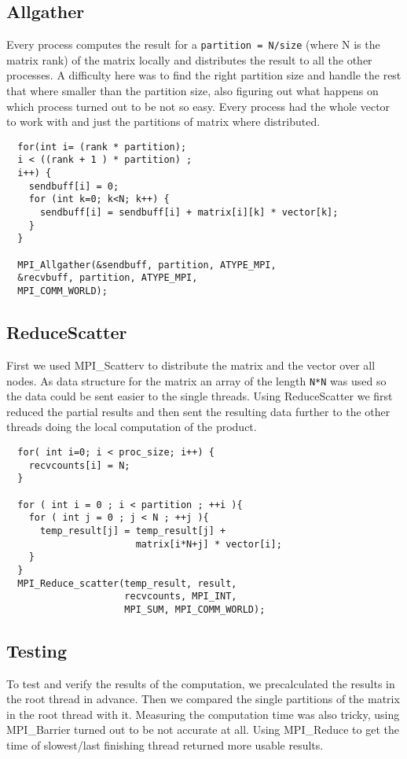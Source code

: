 \subsection{Allgather}


Every process computes the result for a \texttt{partition = N/size} (where  N is the matrix rank) of the matrix locally and distributes the result to all the other processes.
A difficulty here was to find the right partition size and handle the rest that where smaller than the partition size, also figuring out what happens on which process turned out to be not so easy.
Every process had the whole vector to work with and just the partitions of matrix where distributed.


\begin{lstlisting}
  for(int i= (rank * partition);
  i < ((rank + 1 ) * partition) ;
  i++) {
    sendbuff[i] = 0;
    for (int k=0; k<N; k++) {
      sendbuff[i] = sendbuff[i] + matrix[i][k] * vector[k];
    }
  }

  MPI_Allgather(&sendbuff, partition, ATYPE_MPI,
  &recvbuff, partition, ATYPE_MPI,
  MPI_COMM_WORLD);
\end{lstlisting}



\subsection{ReduceScatter}

First we used MPI\_Scatterv to distribute the matrix and the vector over all nodes.
As data structure for the matrix an array of the length \texttt{N*N} was used so the data could be sent easier to the single threads. Using ReduceScatter we first reduced the partial results and then sent the resulting data further to the other threads doing the local computation of the product.

\begin{lstlisting}
  for( int i=0; i < proc_size; i++) {
    recvcounts[i] = N;
  }

  for ( int i = 0 ; i < partition ; ++i ){
    for ( int j = 0 ; j < N ; ++j ){
      temp_result[j] = temp_result[j] +
                       matrix[i*N+j] * vector[i];
    }
  }
  MPI_Reduce_scatter(temp_result, result,
                     recvcounts, MPI_INT,
                     MPI_SUM, MPI_COMM_WORLD);
\end{lstlisting}

\subsection{Testing}
To test and verify the results of the computation, we precalculated the results in the root thread in advance.
Then we compared the single partitions of the matrix in the root thread with it.
Measuring the computation time was also tricky, using MPI\_Barrier turned out to be not accurate at all.
Using MPI\_Reduce to get the time of slowest/last finishing thread returned more usable results.

